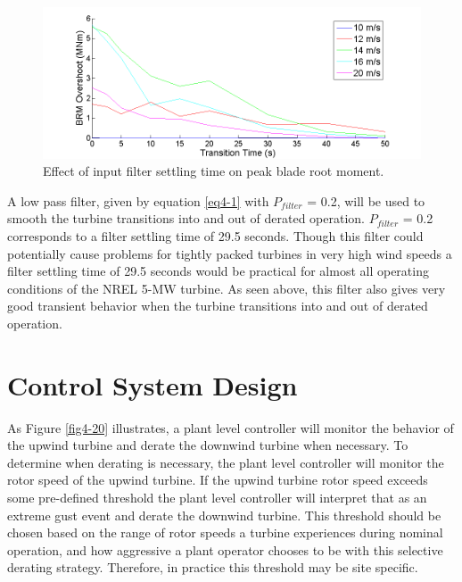 \begin{figure}[htb]
	\centering
		\includegraphics[width = \linewidth]{Figures/ch4Figures/fig4-19.png}
		
	\caption{Effect of input filter settling time on peak blade root moment.}
	\label{fig4-19}
\end{figure}

A low pass filter, given by equation \ref{eq4-1} with $P_{filter}$ = 0.2, will be used to smooth the turbine transitions into and out of derated operation.  $P_{filter}$ = 0.2 corresponds to a filter settling time of 29.5 seconds. Though this filter could potentially cause problems for tightly packed turbines in very high wind speeds a filter settling time of 29.5 seconds would be practical for almost all operating conditions of the NREL 5-MW turbine. As seen above, this filter also gives very good transient behavior when the turbine transitions into and out of derated operation. 


\section{Control System Design} \label{section4-5}

As Figure \ref{fig4-20} illustrates, a plant level controller will monitor the behavior of the upwind turbine and derate the downwind turbine when necessary. To determine when derating is necessary, the plant level controller will monitor the rotor speed of the upwind turbine. If the upwind turbine rotor speed exceeds some pre-defined threshold the plant level controller will interpret that as an extreme gust event and derate the downwind turbine. This threshold should be chosen based on the range of rotor speeds a turbine experiences during nominal operation, and how aggressive a plant operator chooses to be with this selective derating strategy. Therefore, in practice this threshold may be site specific. 

